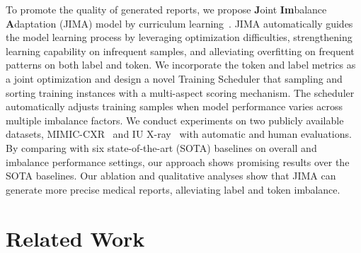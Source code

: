 \documentclass[sn-mathphys-num]{sn-jnl}%
\theoremstyle{thmstyleone}%
\theoremstyle{thmstyletwo}%
\theoremstyle{thmstylethree}%
\begin{document}
To promote the quality of generated reports, we propose \textbf{J}oint \textbf{Im}balance \textbf{A}daptation (JIMA) model by curriculum learning~\cite{bengio2009curriculum}.
JIMA automatically guides the model learning process by leveraging optimization difficulties, strengthening learning capability on infrequent samples, and alleviating overfitting on frequent patterns on both label and token.
We incorporate the token and label metrics as a joint optimization and design a novel Training Scheduler that sampling and sorting training instances with a multi-aspect scoring mechanism.
The scheduler automatically adjusts training samples when model performance varies across multiple imbalance factors.
We conduct experiments on two publicly available datasets, MIMIC-CXR~\cite{johnson2019mimic} and IU X-ray~\cite{demner2016preparing} with automatic and human evaluations.
By comparing with six state-of-the-art (SOTA) baselines on overall and imbalance performance settings, our approach shows promising results over the SOTA baselines.
Our ablation and qualitative analyses show that JIMA can generate more precise medical reports, alleviating label and token imbalance.

\section{Related Work}
\end{document}
